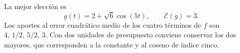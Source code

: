 La mejor elección es
\[
g(t)=2+\sqrt6\cos(5t),\qquad \mathcal E(g)=3.
\]
Los aportes al error cuadrático medio de los cuatro términos de \(f\) son \(4,\,1/2,\,5/2,\,3\). Con dos unidades de presupuesto conviene conservar los dos mayores, que corresponden a la constante y al coseno de índice cinco.
